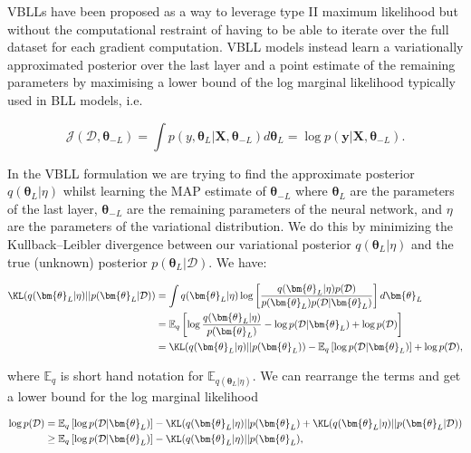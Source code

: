 \noindent VBLLs have been proposed as a way to leverage type II maximum likelihood but without the computational restraint of having to be able to iterate over the full dataset for each gradient computation. VBLL models instead learn a variationally approximated posterior over the last layer and a point estimate of the remaining parameters by maximising a lower bound of the log marginal likelihood typically used in BLL models, i.e.

\begin{equation}
    \mathcal{J}(\mathcal{D}, \bm{\theta}_{-L}) = \int p(y, \bm\theta_L|\mathbf{X}, \bm\theta_{-L}) d \bm\theta_L =  \log p(\mathbf{y}|\mathbf{X}, \bm{\theta}_{-L}).
\end{equation}

\noindent In the VBLL formulation we are trying to find the approximate posterior $q(\bm{\theta}_L|\eta)$ whilst learning the MAP estimate of $\bm{\theta}_{-L}$ where $\bm{\theta}_L$ are the parameters of the last layer, $\bm{\theta}_{-L}$ are the remaining parameters of the neural network, and $\eta$ are the parameters of the variational distribution. We do this by minimizing the Kullback–Leibler divergence between our variational posterior $q(\bm{\theta}_L|\eta)$ and the true (unknown) posterior $p(\bm{\theta}_L|\mathcal{D})$. We have:

\begin{align*}
\KL(q(\bm{\theta}_L|\eta)||p(\bm{\theta}_L|\mathcal{D}))&=\int q(\bm{\theta}_L|\eta) \log\left[\frac{q(\bm{\theta}_L|\eta)p(\mathcal{D})}{p(\bm{\theta}_L)p(\mathcal{D}|\bm{\theta}_L)}\right]d\bm{\theta}_L \\
& = \mathbb{E}_q\left[\log\frac{q(\bm{\theta}_L|\eta)}{p(\bm{\theta}_L)}-\log p(\mathcal{D}|\bm{\theta}_L)+\log p(\mathcal{D})\right]\\
& = \KL(q(\bm{\theta}_L|\eta)||p(\bm{\theta}_L))-\mathbb{E}_q\left[\log p(\mathcal{D}|\bm{\theta}_L)\right]+\log p(\mathcal{D}),
\end{align*}

\noindent where $\mathbb{E}_q$ is short hand notation for $\mathbb{E}_{q(\bm{\theta}_L|\eta)}$. We can rearrange the terms and get a lower bound for the log marginal likelihood

\begin{align}
\label{eq:log_marg}
    \log p(\mathcal{D}) &= \mathbb{E}_q\left[\log p(\mathcal{D}|\bm{\theta}_L)\right]-\KL(q(\bm{\theta}_L|\eta)||p(\bm{\theta}_L)+\KL(q(\bm{\theta}_L|\eta)||p(\bm{\theta}_L|\mathcal{D})) \\
    & \geq \mathbb{E}_q\left[\log p(\mathcal{D}|\bm{\theta}_L)\right]-\KL(q(\bm{\theta}_L|\eta)||p(\bm{\theta}_L),
\end{align}

